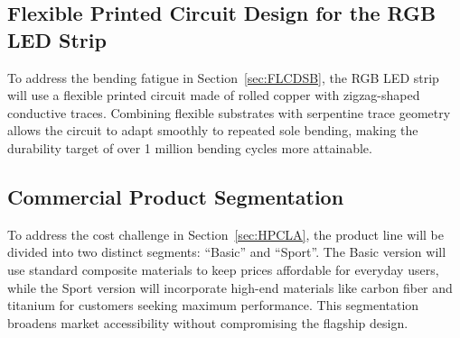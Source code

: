 \subsection{Flexible Printed Circuit Design for the RGB LED Strip} %
To address the bending fatigue in Section~\ref{sec:FLCDSB}, the RGB LED strip will use a flexible printed circuit made of rolled copper with zigzag-shaped conductive traces. Combining flexible substrates with serpentine trace geometry allows the circuit to adapt smoothly to repeated sole bending, making the durability target of over 1 million bending cycles more attainable.

\subsection{Commercial Product Segmentation} %
To address the cost challenge in Section~\ref{sec:HPCLA}, the product line will be divided into two distinct segments: ``Basic'' and ``Sport''. The Basic version will use standard composite materials to keep prices affordable for everyday users, while the Sport version will incorporate high-end materials like carbon fiber and titanium for customers seeking maximum performance. This segmentation broadens market accessibility without compromising the flagship design.

